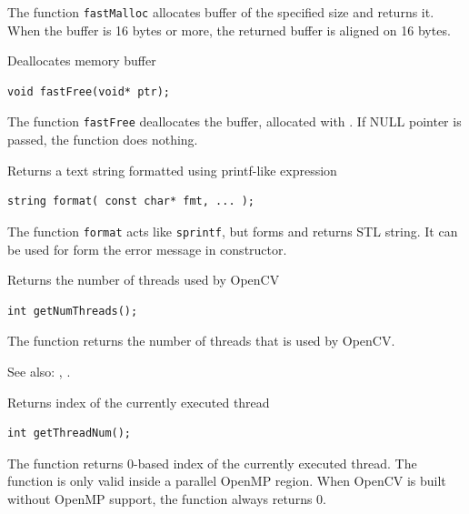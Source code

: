 The function \texttt{fastMalloc} allocates buffer of the specified size and returns it. When the buffer is 16 bytes or more, the returned buffer is aligned on 16 bytes.

\label{fastFree}
Deallocates memory buffer

\begin{lstlisting}
void fastFree(void* ptr);
\end{lstlisting}
\begin{description}
\end{description}

The function \texttt{fastFree} deallocates the buffer, allocated with .
If NULL pointer is passed, the function does nothing.

\label{format}
Returns a text string formatted using printf-like expression

\begin{lstlisting}
string format( const char* fmt, ... );
\end{lstlisting}
\begin{description}
\end{description}

The function \texttt{format} acts like \texttt{sprintf}, but forms and returns STL string. It can be used for form the error message in  constructor.

\label{getNumThreads}
Returns the number of threads used by OpenCV

\begin{lstlisting}
int getNumThreads();
\end{lstlisting}

The function returns the number of threads that is used by OpenCV.

See also: , .


\label{getThreadNum}
Returns index of the currently executed thread

\begin{lstlisting}
int getThreadNum();
\end{lstlisting}

The function returns 0-based index of the currently executed thread. The function is only valid inside a parallel OpenMP region. When OpenCV is built without OpenMP support, the function always returns 0.

